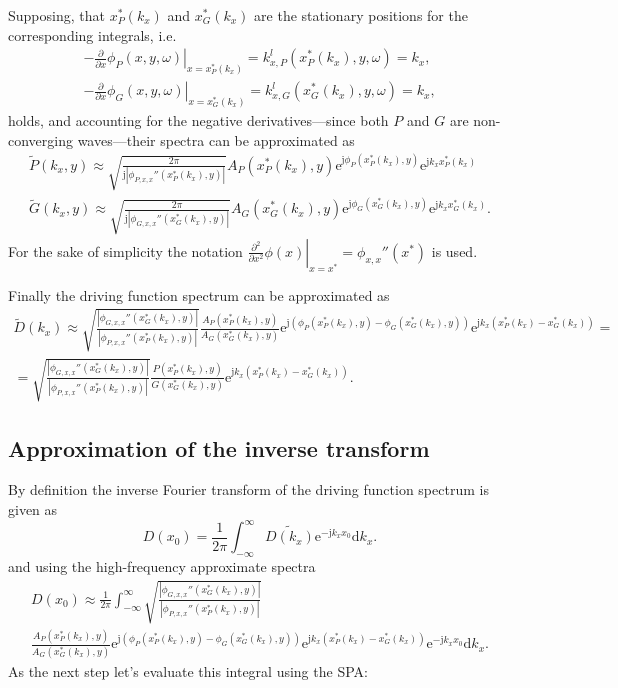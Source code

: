 \documentclass[12pt,a4paper]{article}
\newcommand{\td}{\mathrm{d}}
\newcommand{\te}{\mathrm{e}}
\newcommand{\ti}{\mathrm{j}}
\begin{document}
Supposing, that $x^*_P(k_x)$ and $x^*_G(k_x)$ are the stationary positions for the corresponding integrals, i.e. 
\begin{eqnarray}
- \left. \frac{\partial}{\partial x} \phi_P(x,y,\omega) \right|_{x = x^*_P(k_x)} = k_{x,P}^l(x^*_P(k_x),y,\omega) = k_x, \\
- \left. \frac{\partial}{\partial x} \phi_G(x,y,\omega) \right|_{x = x^*_G(k_x)} = k_{x,G}^l(x^*_G(k_x),y,\omega) = k_x,
\label{eq:xP_xG_in_spatial_domain}
\end{eqnarray}
holds, and accounting for the negative derivatives---since both $P$ and $G$ are non-converging waves---their spectra can be approximated as
\begin{eqnarray}
\tilde{P}(k_x,y) \approx \sqrt{\frac{2\pi}{\ti |\phi_{P,x,x}''(x^*_P(k_x),y)|}} A_P(x^*_P(k_x),y) \te^{\ti \phi_P(x^*_P(k_x),y)} \te^{\ti k_x x^*_P(k_x)}
\\
\tilde{G}(k_x,y) \approx \sqrt{\frac{2\pi}{\ti |\phi_{G,x,x}''(x^*_G(k_x),y)|}} A_G(x^*_G(k_x),y) \te^{\ti \phi_G(x^*_G(k_x),y)} \te^{\ti k_x x^*_G(k_x)}
.
\end{eqnarray}
For the sake of simplicity the notation $\left. \frac{\partial^2}{\partial x^2} \phi(x)\right|_{x = x^*} = \phi_{x,x}''(x^*)$ is used.

Finally the driving function spectrum can be approximated as
\begin{multline}
\tilde{D}(k_x) \approx 
\sqrt{\frac{|\phi_{G,x,x}''(x^*_G(k_x),y)|}{|\phi_{P,x,x}''(x^*_P(k_x),y)|}}
\frac{A_P(x^*_P(k_x),y)}{A_G(x^*_G(k_x),y)}
\te^{\ti \left( \phi_P(x^*_P(k_x),y) - \phi_G(x^*_G(k_x),y)\right)}
\te^{\ti k_x \left( x^*_P(k_x) - x^*_G(k_x)\right)}=
\\
=\sqrt{\frac{|\phi_{G,x,x}''(x^*_G(k_x),y)|}{|\phi_{P,x,x}''(x^*_P(k_x),y)|}}
\frac{P(x^*_P(k_x),y)}{G(x^*_G(k_x),y)}
\te^{\ti k_x \left( x^*_P(k_x) - x^*_G(k_x)\right)}.
\end{multline}


\subsection{Approximation of the inverse transform}

By definition the inverse Fourier transform of the driving function spectrum is given as
\begin{equation}
D(x_0) = \frac{1}{2\pi} \int_{-\infty}^{\infty} \tilde{D(k_x)} \te^{-\ti k_x x_0} \td k_x.
\label{eq:inverse_transform}
\end{equation}
and using the high-frequency approximate spectra
\begin{multline}
D(x_0) \approx \frac{1}{2\pi} \int_{-\infty}^{\infty} 
\sqrt{\frac{|\phi_{G,x,x}''(x^*_G(k_x),y)|}{|\phi_{P,x,x}''(x^*_P(k_x),y)|}}
\\
\frac{A_P(x^*_P(k_x),y)}{A_G(x^*_G(k_x),y)}
\te^{\ti \left( \phi_P(x^*_P(k_x),y) - \phi_G(x^*_G(k_x),y)\right)}
\te^{\ti k_x \left( x^*_P(k_x) - x^*_G(k_x)\right)}
 \te^{-\ti k_x x_0} \td k_x.
\label{eq:inverse_transform_2}
\end{multline}
As the next step let's evaluate this integral using the SPA:
\end{document}
